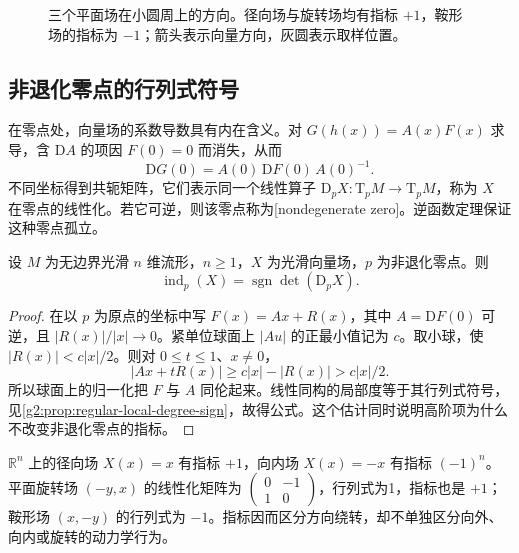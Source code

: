 \begin{figure}[htbp]
	\centering
	
	\caption{三个平面场在小圆周上的方向。径向场与旋转场均有指标 \(+1\)，鞍形场的指标为 \(-1\)；箭头表示向量方向，灰圆表示取样位置。}
	\label{g2:fig:vector-index-models}
\end{figure}

\subsection{非退化零点的行列式符号}
\label{g2:subsec:1603:02}

在零点处，向量场的系数导数具有内在含义。对 \(G(h(x))=A(x)F(x)\) 求导，含 \(\mathrm DA\) 的项因 \(F(0)=0\) 而消失，从而
\[
	\mathrm DG(0)=A(0)\,\mathrm DF(0)\,A(0)^{-1}.
\]
不同坐标得到共轭矩阵，它们表示同一个线性算子 \(\mathrm D_pX:\mathrm T_pM\to\mathrm T_pM\)，称为 \(X\) 在零点的线性化。若它可逆，则该零点称为[nondegenerate zero]。逆函数定理保证这种零点孤立。

\begin{proposition}\label{g2:prop:nondegenerate-vector-index}
	设 \(M\) 为无边界光滑 \(n\) 维流形，\(n\ge1\)，\(X\) 为光滑向量场，\(p\) 为非退化零点。则
	\begin{equation}\label{g2:eq:nondegenerate-index}
		\operatorname{ind}_p(X)=\operatorname{sgn}\det(\mathrm D_pX).
	\end{equation}
\end{proposition}
\begin{proof}
	在以 \(p\) 为原点的坐标中写 \(F(x)=Ax+R(x)\)，其中 \(A=\mathrm DF(0)\) 可逆，且 \(|R(x)|/|x|\to0\)。紧单位球面上 \(|Au|\) 的正最小值记为 \(c\)。取小球，使 \(|R(x)|<c|x|/2\)。则对 \(0\le t\le1\)、\(x\ne0\)，
	\[
		|Ax+tR(x)|\ge c|x|-|R(x)|>c|x|/2.
	\]
	所以球面上的归一化把 \(F\) 与 \(A\) 同伦起来。线性同构的局部度等于其行列式符号，见\cref{g2:prop:regular-local-degree-sign}，故得公式。这个估计同时说明高阶项为什么不改变非退化零点的指标。
\end{proof}

\begin{example}\label{g2:exm:linear-vector-indices}
	\(\mathbb R^n\) 上的径向场 \(X(x)=x\) 有指标 \(+1\)，向内场 \(X(x)=-x\) 有指标 \((-1)^n\)。平面旋转场 \((-y,x)\) 的线性化矩阵为 \(\left(\begin{smallmatrix}0&-1\\1&0\end{smallmatrix}\right)\)，行列式为1，指标也是 \(+1\)；鞍形场 \((x,-y)\) 的行列式为 \(-1\)。指标因而区分方向绕转，却不单独区分向外、向内或旋转的动力学行为。
\end{example}

